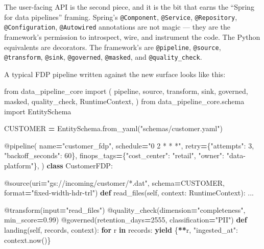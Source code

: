 \documentclass[
  11pt,
  british,
  oneside]{book}
\newenvironment{Shaded}{\begin{snugshade}}{\end{snugshade}}
\newcommand{\AttributeTok}[1]{\textcolor[rgb]{0.77,0.63,0.00}{#1}}
\newcommand{\BuiltInTok}[1]{#1}
\newcommand{\ControlFlowTok}[1]{\textcolor[rgb]{0.13,0.29,0.53}{\textbf{#1}}}
\newcommand{\DecValTok}[1]{\textcolor[rgb]{0.00,0.00,0.81}{#1}}
\newcommand{\FloatTok}[1]{\textcolor[rgb]{0.00,0.00,0.81}{#1}}
\newcommand{\ImportTok}[1]{#1}
\newcommand{\KeywordTok}[1]{\textcolor[rgb]{0.13,0.29,0.53}{\textbf{#1}}}
\newcommand{\NormalTok}[1]{#1}
\newcommand{\OperatorTok}[1]{\textcolor[rgb]{0.81,0.36,0.00}{\textbf{#1}}}
\newcommand{\StringTok}[1]{\textcolor[rgb]{0.31,0.60,0.02}{#1}}
\newcommand{\VariableTok}[1]{\textcolor[rgb]{0.00,0.00,0.00}{#1}}
\begin{document}
The user-facing API is the second piece, and it is the bit that earns
the ``Spring for data pipelines'' framing. Spring's \texttt{@Component},
\texttt{@Service}, \texttt{@Repository}, \texttt{@Configuration},
\texttt{@Autowired} annotations are not magic --- they are the
framework's permission to introspect, wire, and instrument the code. The
Python equivalents are decorators. The framework's are
\texttt{@pipeline}, \texttt{@source}, \texttt{@transform},
\texttt{@sink}, \texttt{@governed}, \texttt{@masked}, and
\texttt{@quality\_check}.

A typical FDP pipeline written against the new surface looks like this:

\begin{Shaded}
\begin{Highlighting}[]
\ImportTok{from}\NormalTok{ data\_pipeline\_core }\ImportTok{import}\NormalTok{ (}
\NormalTok{    pipeline, source, transform, sink,}
\NormalTok{    governed, masked, quality\_check, RuntimeContext,}
\NormalTok{)}
\ImportTok{from}\NormalTok{ data\_pipeline\_core.schema }\ImportTok{import}\NormalTok{ EntitySchema}

\NormalTok{CUSTOMER }\OperatorTok{=}\NormalTok{ EntitySchema.from\_yaml(}\StringTok{"schemas/customer.yaml"}\NormalTok{)}

\AttributeTok{@pipeline}\NormalTok{(}
\NormalTok{    name}\OperatorTok{=}\StringTok{"customer\_fdp"}\NormalTok{,}
\NormalTok{    schedule}\OperatorTok{=}\StringTok{"0 2 * * *"}\NormalTok{,}
\NormalTok{    retry}\OperatorTok{=}\NormalTok{\{}\StringTok{"attempts"}\NormalTok{: }\DecValTok{3}\NormalTok{, }\StringTok{"backoff\_seconds"}\NormalTok{: }\DecValTok{60}\NormalTok{\},}
\NormalTok{    finops\_tags}\OperatorTok{=}\NormalTok{\{}\StringTok{"cost\_center"}\NormalTok{: }\StringTok{"retail"}\NormalTok{, }\StringTok{"owner"}\NormalTok{: }\StringTok{"data{-}platform"}\NormalTok{\},}
\NormalTok{)}
\KeywordTok{class}\NormalTok{ CustomerFDP:}

    \AttributeTok{@source}\NormalTok{(uri}\OperatorTok{=}\StringTok{"gs://incoming/customer/*.dat"}\NormalTok{,}
\NormalTok{            schema}\OperatorTok{=}\NormalTok{CUSTOMER, }\BuiltInTok{format}\OperatorTok{=}\StringTok{"fixed{-}width{-}hdr{-}trl"}\NormalTok{)}
    \KeywordTok{def}\NormalTok{ read\_files(}\VariableTok{self}\NormalTok{, context: RuntimeContext): ...}

    \AttributeTok{@transform}\NormalTok{(}\BuiltInTok{input}\OperatorTok{=}\StringTok{"read\_files"}\NormalTok{)}
    \AttributeTok{@quality\_check}\NormalTok{(dimension}\OperatorTok{=}\StringTok{"completeness"}\NormalTok{, min\_score}\OperatorTok{=}\FloatTok{0.99}\NormalTok{)}
    \AttributeTok{@governed}\NormalTok{(retention\_days}\OperatorTok{=}\DecValTok{2555}\NormalTok{, classification}\OperatorTok{=}\StringTok{"PII"}\NormalTok{)}
    \KeywordTok{def}\NormalTok{ landing(}\VariableTok{self}\NormalTok{, records, context):}
        \ControlFlowTok{for}\NormalTok{ r }\KeywordTok{in}\NormalTok{ records:}
            \ControlFlowTok{yield}\NormalTok{ \{}\OperatorTok{**}\NormalTok{r, }\StringTok{"ingested\_at"}\NormalTok{: context.now()\}}


\end{Highlighting}
\end{Shaded}
\end{document}
